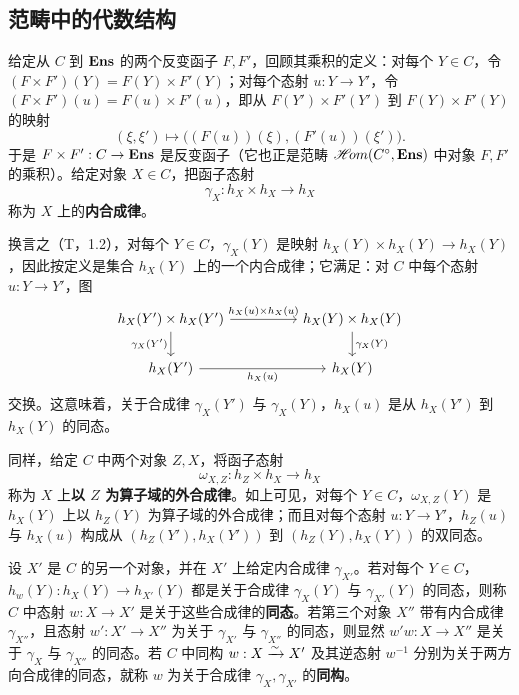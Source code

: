 \subsection{范畴中的代数结构}
给定从 $C$ 到 $\mathbf{Ens}$ 的两个反变函子 $F,F'$，回顾其乘积的定义：对每个 $Y\in C$，令 $(F\times F')(Y)=F(Y)\times F'(Y)$；对每个态射 $u:Y\to Y'$，令 $(F\times F')(u)=F(u)\times F'(u)$，即从 $F(Y')\times F'(Y')$ 到 $F(Y)\times F'(Y)$ 的映射
\[
(\xi,\xi')\longmapsto\bigl((F(u))(\xi),(F'(u))(\xi')\bigr).
\]
于是 $F\times F':C\to\mathbf{Ens}$ 是反变函子（它也正是范畴 $\mathscr{H}\!om(C^\circ,\mathbf{Ens})$ 中对象 $F,F'$ 的乘积）。给定对象 $X\in C$，把函子态射
\begin{equation}\tag{8.2.1.1}
\gamma_X:h_X\times h_X\longrightarrow h_X
\end{equation}
称为 $X$ 上的\textbf{内合成律}。

换言之（T，1.2），对每个 $Y\in C$，$\gamma_X(Y)$ 是映射 $h_X(Y)\times h_X(Y)\to h_X(Y)$，因此按定义是集合 $h_X(Y)$ 上的一个内合成律；它满足：对 $C$ 中每个态射 $u:Y\to Y'$，图
\[
\begin{tikzcd}[column sep=huge]
h_X(Y')\times h_X(Y')\arrow[r,"h_X(u)\times h_X(u)"]\arrow[d,"\gamma_X(Y')"']&h_X(Y)\times h_X(Y)\arrow[d,"\gamma_X(Y)"]\\
h_X(Y')\arrow[r,"h_X(u)"']&h_X(Y)
\end{tikzcd}
\]
交换。这意味着，关于合成律 $\gamma_X(Y')$ 与 $\gamma_X(Y)$，$h_X(u)$ 是从 $h_X(Y')$ 到 $h_X(Y)$ 的同态。

同样，给定 $C$ 中两个对象 $Z,X$，将函子态射
\begin{equation}\tag{8.2.1.2}
\omega_{X,Z}:h_Z\times h_X\longrightarrow h_X
\end{equation}
称为 $X$ 上\textbf{以 $Z$ 为算子域的外合成律}。如上可见，对每个 $Y\in C$，$\omega_{X,Z}(Y)$ 是 $h_X(Y)$ 上以 $h_Z(Y)$ 为算子域的外合成律；而且对每个态射 $u:Y\to Y'$，$h_Z(u)$ 与 $h_X(u)$ 构成从 $(h_Z(Y'),h_X(Y'))$ 到 $(h_Z(Y),h_X(Y))$ 的双同态。

设 $X'$ 是 $C$ 的另一个对象，并在 $X'$ 上给定内合成律 $\gamma_{X'}$。若对每个 $Y\in C$，$h_w(Y):h_X(Y)\to h_{X'}(Y)$ 都是关于合成律 $\gamma_X(Y)$ 与 $\gamma_{X'}(Y)$ 的同态，则称 $C$ 中态射 $w:X\to X'$ 是关于这些合成律的\textbf{同态}。若第三个对象 $X''$ 带有内合成律 $\gamma_{X''}$，且态射 $w':X'\to X''$ 为关于 $\gamma_{X'}$ 与 $\gamma_{X''}$ 的同态，则显然 $w'w:X\to X''$ 是关于 $\gamma_X$ 与 $\gamma_{X''}$ 的同态。若 $C$ 中同构 $w:X\xrightarrow{\sim} X'$ 及其逆态射 $w^{-1}$ 分别为关于两方向合成律的同态，就称 $w$ 为关于合成律 $\gamma_X,\gamma_{X'}$ 的\textbf{同构}。

